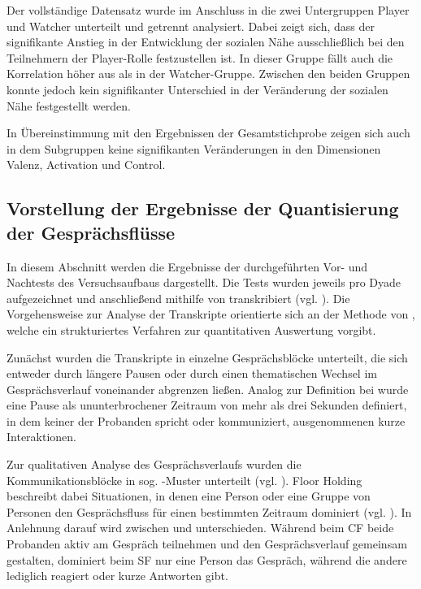 Der vollständige Datensatz wurde im Anschluss in die zwei Untergruppen Player und Watcher unterteilt und getrennt analysiert. Dabei zeigt sich, dass der signifikante Anstieg in der Entwicklung der sozialen Nähe ausschließlich bei den Teilnehmern der Player-Rolle festzustellen ist. In dieser Gruppe fällt auch die Korrelation höher aus als in der Watcher-Gruppe. Zwischen den beiden Gruppen konnte jedoch kein signifikanter Unterschied in der Veränderung der sozialen Nähe festgestellt werden.

In Übereinstimmung mit den Ergebnissen der Gesamtstichprobe zeigen sich auch in dem Subgruppen keine signifikanten Veränderungen in den Dimensionen Valenz, Activation und Control.

\subsection{Vorstellung der Ergebnisse der Quantisierung der Gesprächsflüsse}

In diesem Abschnitt werden die Ergebnisse der durchgeführten Vor- und Nachtests des Versuchsaufbaus dargestellt. Die Tests wurden jeweils pro Dyade aufgezeichnet und anschließend mithilfe von  transkribiert (vgl. \citealp{bain_whisperx_2023}). Die Vorgehensweise zur Analyse der Transkripte orientierte sich an der Methode von  \cite{nasir_effect_2015}, welche ein strukturiertes Verfahren zur quantitativen Auswertung vorgibt.

Zunächst wurden die Transkripte in einzelne Gesprächsblöcke unterteilt, die sich entweder durch längere Pausen oder durch einen thematischen Wechsel im Gesprächsverlauf voneinander abgrenzen ließen. Analog zur Definition bei \citeauthor{nasir_effect_2015} wurde eine Pause als ununterbrochener Zeitraum von mehr als drei Sekunden definiert, in dem keiner der Probanden spricht oder kommuniziert, ausgenommenen kurze Interaktionen.

Zur qualitativen Analyse des Gesprächsverlaufs wurden die Kommunikationsblöcke in sog.  -Muster unterteilt (vgl. \citealp{edelsky_whos_1981}). Floor Holding beschreibt dabei Situationen, in denen eine Person oder eine Gruppe von Personen den Gesprächsfluss für einen bestimmten Zeitraum dominiert (vgl. \citealp[S. 135]{nasir_effect_2015}). In Anlehnung darauf wird zwischen  und   unterschieden. Während beim \ac{CF} beide Probanden aktiv am Gespräch teilnehmen und den Gesprächsverlauf gemeinsam gestalten, dominiert beim \ac{SF} nur eine Person das Gespräch, während die andere lediglich reagiert oder kurze Antworten gibt.

